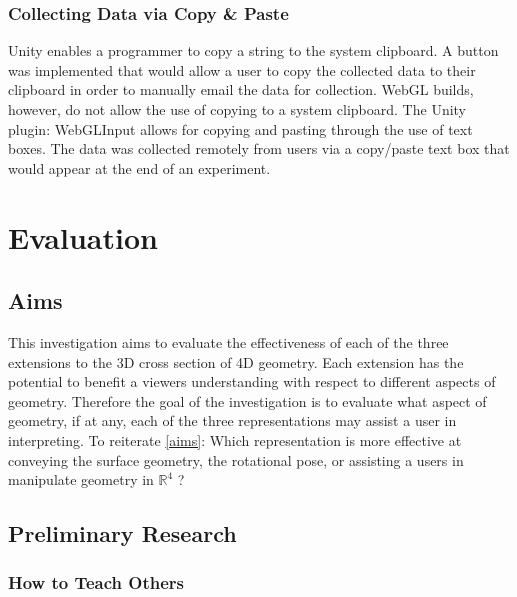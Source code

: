 \documentclass{l4proj}
\begin{document}
\subsection*{Collecting Data via Copy \& Paste}

Unity enables a programmer to copy a string to the system clipboard. A button was implemented that would allow a user to copy the collected data to their clipboard in order to manually email the data for collection. WebGL builds, however, do not allow the use of copying to a system clipboard. The Unity plugin: WebGLInput \citep{kou-yeung_webglinput_nodate} allows for copying and pasting through the use of text boxes.
The data was collected remotely from users via a copy/paste text box that would appear at the end of an experiment.

\chapter{Evaluation} 

\section{Aims} 

This investigation aims to evaluate the effectiveness of each of the three extensions to the 3D cross section of 4D geometry. Each extension has the potential to benefit a viewers understanding with respect to different aspects of geometry. Therefore the goal of the investigation is to evaluate what aspect of geometry, if at any, each of the three representations may assist a user in interpreting. To reiterate \cref{aims}: Which representation is more effective at conveying the surface geometry, the rotational pose, or assisting a users in manipulate geometry in $\mathbb{R}^4$ ?

\section{Preliminary Research}

\subsection{How to Teach Others}
\end{document}
